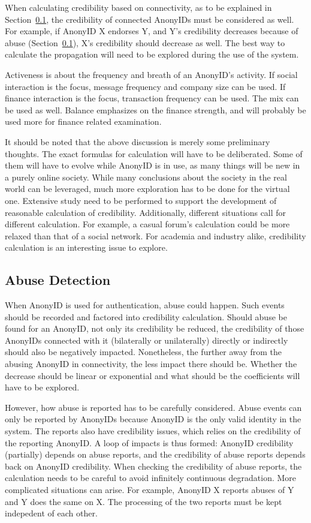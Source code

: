 \documentclass[12pt, a4paper]{article}
\begin{document}
When calculating credibility based on connectivity, as to be explained in Section~\ref{abuse}, the credibility of connected AnonyIDs must be considered as well. For example, if AnonyID X endorses Y, and Y's credibility decreases because of abuse (Section~\ref{abuse}), X's credibility should decrease as well. The best way to calculate the propagation will need to be explored during the use of the system.

Activeness is about the frequency and breath of an AnonyID's activity. If social interaction is the focus, message frequency and company size can be used. If finance interaction is the focus, transaction frequency can be used. The mix can be used as well. Balance emphasizes on the finance strength, and will probably be used more for finance related examination. 

It should be noted that the above discussion is merely some preliminary thoughts. The exact formulas for calculation will have to be deliberated. Some of them will have to evolve while AnonyID is in use, as many things will be new in a purely online society. While many conclusions about the society in the real world can be leveraged, much more exploration has to be done for the virtual one. Extensive study need to be performed to support the development of reasonable calculation of credibility. Additionally, different situations call for different calculation. For example, a casual forum's calculation could be more relaxed than that of a social network. For academia and industry alike, credibility calculation is an interesting issue to explore.

\subsection{Abuse Detection}
\label{abuse}

When AnonyID is used for authentication, abuse could happen. Such events should be recorded and factored into credibility calculation. Should abuse be found for an AnonyID, not only its credibility be reduced, the credibility of those AnonyIDs connected with it (bilaterally or unilaterally) directly or indirectly should also be negatively impacted. Nonetheless, the further away from the abusing AnonyID in connectivity, the less impact there should be. Whether the decrease should be linear or exponential and what should be the coefficients will have to be explored.

However, how abuse is reported has to be carefully considered. Abuse events can only be reported by AnonyIDs because AnonyID is the only valid identity in the system. The reports also have credibility issues, which relies on the credibility of the reporting AnonyID. A loop of impacts is thus formed: AnonyID credibility (partially) depends on abuse reports, and the credibility of abuse reports depends back on AnonyID credibility. When checking the credibility of abuse reports, the calculation needs to be careful to avoid infinitely continuous degradation. More complicated situations can arise. For example, AnonyID X reports abuses of Y and Y does the same on X. The processing of the two reports must be kept indepedent of each other.
\end{document}
